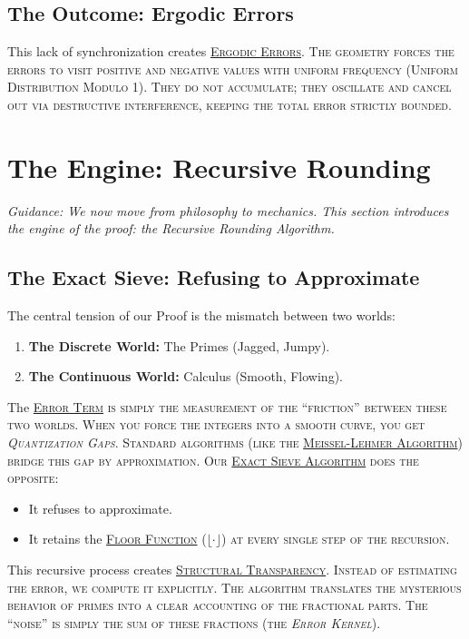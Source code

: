 \documentclass[sn-mathphys-num, pdflatex, referee]{sn-jnl}
\newcommand{\gterm}[2]{\begingroup\normalfont\scshape\hyperlink{#1}{#2}\endgroup}
\begin{document}
\subsection{The Outcome: Ergodic Errors}
This lack of synchronization creates \gterm{ergodic_errors}{Ergodic Errors}. The geometry forces the errors to visit positive and negative values with uniform frequency (Uniform Distribution Modulo 1). They do not accumulate; they oscillate and cancel out via destructive interference, keeping the total error strictly bounded.
\section{The Engine: Recursive Rounding}
\label{sec:engine}

\textit{Guidance: We now move from philosophy to mechanics. This section introduces the engine of the proof: the Recursive Rounding Algorithm.} 

\subsection{The Exact Sieve: Refusing to Approximate}

The central tension of our Proof is the mismatch between two worlds:
\begin{enumerate}
    \item \textbf{The Discrete World:} The Primes (Jagged, Jumpy).
    \item \textbf{The Continuous World:} Calculus (Smooth, Flowing).
\end{enumerate}
The \gterm{error_term}{Error Term} is simply the measurement of the ``friction'' between these two worlds. When you force the integers into a smooth curve, you get \textit{Quantization Gaps}. Standard algorithms (like the \gterm{meissel_lehmer}{Meissel-Lehmer Algorithm}) bridge this gap by approximation. Our \gterm{exact_sieve}{Exact Sieve Algorithm} does the opposite:
\begin{itemize}
    \item It refuses to approximate.
    \item It retains the \gterm{floor_function}{Floor Function} ($\lfloor \cdot \rfloor$) at every single step of the recursion.
\end{itemize}

This recursive process creates \gterm{structural_transparency}{Structural Transparency}. Instead of estimating the error, we compute it explicitly. The algorithm translates the mysterious behavior of primes into a clear accounting of the fractional parts. The ``noise'' is simply the sum of these fractions (the \textit{Error Kernel}).
\end{document}
